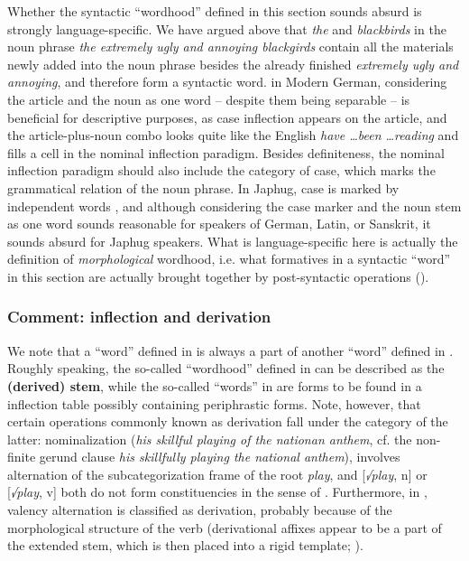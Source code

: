 \documentclass[a4paper, oneside, scheme=plain, 12pt]{article}
\newcommand*{\citepage}[1]{p.~{#1}}
\newcommand*{\concept}[1]{\textbf{#1}}
\newcommand{\form}[1]{\emph{#1}}
\begin{document}
Whether the syntactic ``wordhood'' defined in this section sounds absurd is strongly language-specific.
We have argued above that \form{the} and \form{blackbirds}
in the noun phrase \form{the extremely ugly and annoying blackgirds}
contain all the materials newly added into the noun phrase
besides the already finished \form{extremely ugly and annoying},
and therefore form a syntactic word.
in Modern German, considering the article and the noun as one word
-- despite them being separable -- is beneficial for descriptive purposes,
as case inflection appears on the article,
and the article-plus-noun combo looks quite like the English \form{have \dots been \dots reading}
and fills a cell in the nominal inflection paradigm.
Besides definiteness, the nominal inflection paradigm should also include the category of case,
which marks the grammatical relation of the noun phrase.
In Japhug, case is marked by independent words \citep[\citepage{8.2.1}]{jacques2021grammar},
and although considering the case marker and the noun stem as one word sounds reasonable for
speakers of German, Latin, or Sanskrit,
it sounds absurd for Japhug speakers.
What is language-specific here is actually the definition of 
\emph{morphological} wordhood, i.e. what formatives in a syntactic ``word'' in this section
are actually brought together by post-syntactic operations ().

\subsubsection{Comment: inflection and derivation}\label{sec:inflection-derivation}

We note that a ``word'' defined in 
is always a part of another ``word'' defined in .
Roughly speaking, the so-called ``wordhood'' defined in 
can be described as the \concept{(derived) stem},
while the so-called ``words'' in 
are forms to be found in a inflection table possibly containing periphrastic forms.
Note, however, that certain operations commonly known as derivation
fall under the category of the latter:
nominalization (\form{his skillful playing of the nationan anthem},
cf. the non-finite gerund clause \form{his skillfully playing the national anthem}),
involves alternation of the subcategorization frame of the root \form{play},
and [\form{√play}, n] or [\form{√play}, v] both do not form constituencies
in the sense of .
Furthermore, in \citet{jacques2021grammar}, valency alternation is classified as derivation,
probably because of the morphological structure of the verb
(derivational affixes appear to be a part of the extended stem,
which is then placed into a rigid template; ).
\end{document}
